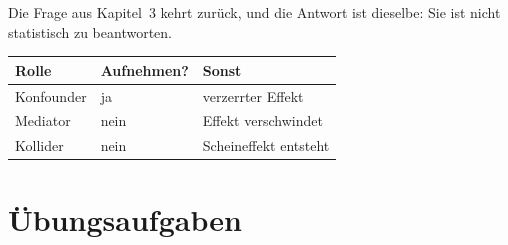 \begin{warnung}
Die Frage aus Kapitel~3 kehrt zurück, und die Antwort ist dieselbe: Sie ist nicht statistisch zu beantworten.

\begin{center}
{\small
\renewcommand{\arraystretch}{1.5}
\begin{tabular}{@{}P{2.4cm}P{2.4cm}P{3.4cm}@{}}
\toprule
\textbf{Rolle} & \textbf{Aufnehmen?} & \textbf{Sonst}\\
\midrule
Konfounder & \textcolor{gruen}{ja} & verzerrter Effekt\\
Mediator & \textcolor{akzent}{nein} & Effekt verschwindet\\
Kollider & \textcolor{akzent}{nein} & \textcolor{akzent}{Scheineffekt entsteht}\\
\bottomrule
\end{tabular}}
\end{center}

\begin{center}
\begin{minipage}{0.88\textwidth}
\end{minipage}
\end{center}
\end{warnung}

\section{Übungsaufgaben}

